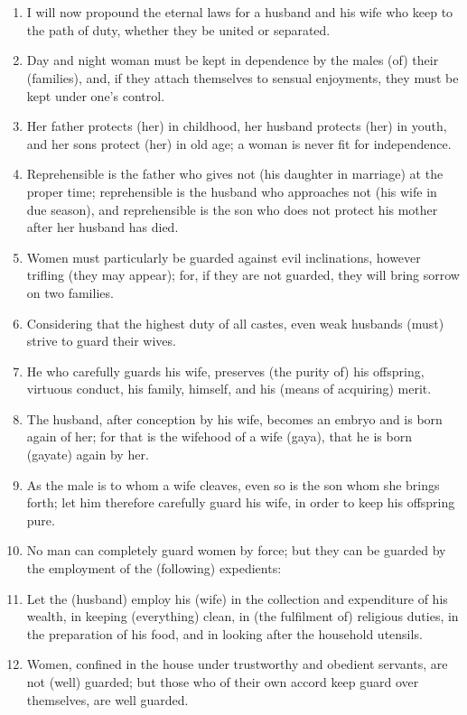 \chapter{}
\begin{enumerate}
\item I will now propound the eternal laws for a husband and his wife who keep to the path of duty, whether they be united or separated.
\item Day and night woman must be kept in dependence by the males (of) their (families), and, if they attach themselves to sensual enjoyments, they must be kept under one's control.
\item Her father protects (her) in childhood, her husband protects (her) in youth, and her sons protect (her) in old age; a woman is never fit for independence.
\item Reprehensible is the father who gives not (his daughter in marriage) at the proper time; reprehensible is the husband who approaches not (his wife in due season), and reprehensible is the son who does not protect his mother after her husband has died.
\item Women must particularly be guarded against evil inclinations, however trifling (they may appear); for, if they are not guarded, they will bring sorrow on two families.
\item Considering that the highest duty of all castes, even weak husbands (must) strive to guard their wives.
\item He who carefully guards his wife, preserves (the purity of) his offspring, virtuous conduct, his family, himself, and his (means of acquiring) merit.
\item The husband, after conception by his wife, becomes an embryo and is born again of her; for that is the wifehood of a wife (gaya), that he is born (gayate) again by her.
\item As the male is to whom a wife cleaves, even so is the son whom she brings forth; let him therefore carefully guard his wife, in order to keep his offspring pure.
\item No man can completely guard women by force; but they can be guarded by the employment of the (following) expedients:
\item Let the (husband) employ his (wife) in the collection and expenditure of his wealth, in keeping (everything) clean, in (the fulfilment of) religious duties, in the preparation of his food, and in looking after the household utensils.
\item Women, confined in the house under trustworthy and obedient servants, are not (well) guarded; but those who of their own accord keep guard over themselves, are well guarded.

\end{enumerate}
